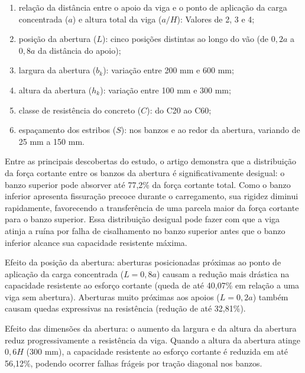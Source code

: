 \begin{enumerate}[label=\alph*)]

\item relação da distância entre o apoio da viga e o ponto de aplicação da carga concentrada ($a$) e altura total da viga ($a/H$): Valores de 2, 3 e 4;

\item posição da abertura ($L$): cinco posições distintas ao longo do vão (de $0,2a$ a $0,8a$ da distância do apoio);

\item largura da abertura ($b_k$): variação entre 200 mm e 600 mm;

\item altura da abertura ($h_k$): variação entre 100 mm e 300 mm;

\item classe de resistência do concreto ($C$): do C20 ao C60;

\item espaçamento dos estribos ($S$): nos banzos e ao redor da abertura, variando de 25 mm a 150 mm.

\end{enumerate}

Entre as principais descobertas do estudo, o artigo demonstra que a distribuição da força cortante entre os banzos da abertura é significativamente desigual: o banzo superior pode absorver até 77,2\% da força cortante total. Como o banzo inferior apresenta fissuração precoce durante o carregamento, sua rigidez diminui rapidamente, favorecendo a transferência de uma parcela maior da força cortante para o banzo superior. Essa distribuição desigual pode fazer com que a viga atinja a ruína por falha de cisalhamento no banzo superior antes que o banzo inferior alcance sua capacidade resistente máxima.

Efeito da posição da abertura: aberturas posicionadas próximas ao ponto de aplicação da carga concentrada ($L = 0,8a$) causam a redução mais drástica na capacidade resistente ao esforço cortante (queda de até 40,07\% em relação a uma viga sem abertura). Aberturas muito próximas aos apoios ($L = 0,2a$) também causam quedas expressivas na resistência (redução de até 32,81\%).

Efeito das dimensões da abertura: o aumento da largura e da altura da abertura reduz progressivamente a resistência da viga. Quando a altura da abertura atinge $0,6H$ (300 mm), a capacidade resistente ao esforço cortante é reduzida em até 56,12\%, podendo ocorrer falhas frágeis por tração diagonal nos banzos.


